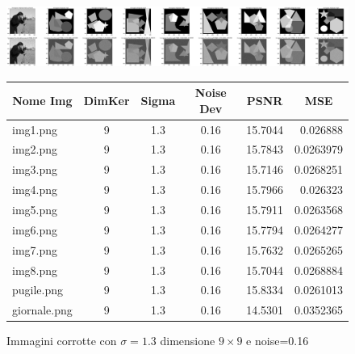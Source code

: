 \begin{figure}[H]
    \centering
    \begin{minipage}[h]{\textwidth}
    \includegraphics[width=\linewidth]{output/tabCorrotte/imgcorr14.png}\label{fig:imgcorrotte9x90.16}
    \end{minipage}
    \begin{minipage}[h]{\textwidth}
        \centering
        
        \begin{tabular}{|l c c c c r|}
            \hline
            \multicolumn{1}{|c}{\textbf{Nome Img}} & \multicolumn{1}{|c}{\textbf{DimKer}} & \multicolumn{1}{|c}{\textbf{Sigma}} & \multicolumn{1}{|c}{\textbf{Noise Dev}} & \multicolumn{1}{|c}{\textbf{PSNR}} & \multicolumn{1}{|c|}{\textbf{MSE}} \\ \hline
                img1.png & 9 & 1.3 & 0.16 & 15.7044 & 0.026888 \\
                img2.png & 9 & 1.3 & 0.16 & 15.7843 & 0.0263979 \\
                img3.png & 9 & 1.3 & 0.16 & 15.7146 & 0.0268251 \\
                img4.png & 9 & 1.3 & 0.16 & 15.7966 & 0.026323 \\
                img5.png & 9 & 1.3 & 0.16 & 15.7911 & 0.0263568 \\
                img6.png & 9 & 1.3 & 0.16 & 15.7794 & 0.0264277 \\
                img7.png & 9 & 1.3 & 0.16 & 15.7632 & 0.0265265 \\
                img8.png & 9 & 1.3 & 0.16 & 15.7044 & 0.0268884 \\
                pugile.png & 9 & 1.3 & 0.16 & 15.8334 & 0.0261013\\
                giornale.png & 9 & 1.3 & 0.16 & 14.5301 & 0.0352365 \\ \hline
            \end{tabular}\label{tab:tabcorrotte9x90.16}
        
        \end{minipage}
    \captionsetup{labelformat=andtable}
    \caption{Immagini corrotte con $\sigma = 1.3$ dimensione $9 \times 9$ e noise=0.16}
\end{figure}




